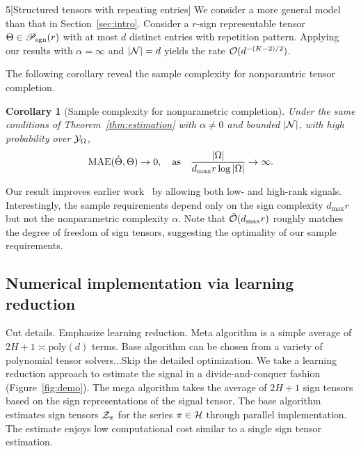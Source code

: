 \documentclass{article}
\theoremstyle{plain}
\newtheorem{cor}{Corollary}
\theoremstyle{definition}
\def\caliP{\mathscr{P}_{\textup{sgn}}}
\begin{document}
\begin{customexample}{5}[Structured tensors with repeating entries]
We consider a more general model than that in Section~\ref{sec:intro}. Consider a $r$-sign representable tensor $\Theta\in \caliP(r)$ with at most $d$ distinct entries with repetition pattern. Applying our results with $\alpha=\infty$ and $|\mathcal{N}|=d$ yields the rate $\mathcal{O}(d^{-(K-2)/2})$. %
\end{customexample}

The following corollary reveal the sample complexity for nonparamtric tensor completion. 
\begin{cor}[Sample complexity for nonparametric completion] Under the same conditions of Theorem~\ref{thm:estimation} with $\alpha\neq 0$ and bounded $|\mathcal{N}|$, with high probability over $\mathcal{Y}_\Omega$, 
\[
\textup{MAE}(\hat \Theta, \Theta)\to 0, \quad \text{as}\quad {|\Omega|\over {d_{\max}r} \log |\Omega|}\to \infty.
\]
\end{cor}
\vspace{-.2cm}
Our result improves earlier work~\citep{yuan2016tensor,ghadermarzy2019near,pmlr-v119-lee20i} by allowing both low- and high-rank signals. Interestingly, the sample requirements depend only on the sign complexity $d_{\max}r$ but not the nonparametric complexity $\alpha$. Note that $\tilde {\mathcal{O}}(d_{\max}r)$ roughly matches the degree of freedom of sign tensors, suggesting the optimality of our sample requirements. 

\subsection{Numerical implementation via learning reduction}
{\color{red} Cut details. Emphasize learning reduction. Meta algorithm is a simple average of $2H+1\asymp \text{poly}(d)$ terms. Base algorithm can be chosen from a variety of polynomial tensor solvers...Skip the detailed optimization. }
We take a learning reduction approach to estimate the signal in a divide-and-conquer fashion (Figure~\ref{fig:demo}). The mega algorithm takes the average of $2H+1$ sign tensors based on the sign representations of the signal tensor. The base algorithm estimates sign tensors $\mathcal{Z}_\pi$ for the series $\pi \in \mathcal{H}$ through parallel implementation. The estimate enjoys low computational cost similar to a single sign tensor estimation.  
\end{document}
